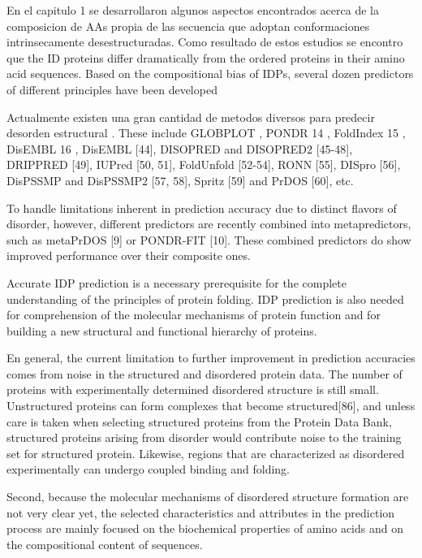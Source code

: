 En el capitulo 1 se desarrollaron algunos aspectos encontrados acerca de la composicion de AAs propia de las secuencia que adoptan conformaciones intrinsecamente desestructuradas.
Como resultado de estos estudios se encontro que the ID proteins differ dramatically from the ordered proteins in their amino acid sequences. 
Based on the compositional bias of IDPs, several dozen predictors of different principles have been developed

Actualmente existen una gran cantidad de metodos diversos para predecir desorden estructural \cite{he2009predicting}.
These include GLOBPLOT \cite{linding2003globplot}, PONDR 14 , FoldIndex 15 , DisEMBL 16 ,  DisEMBL [44], DISOPRED and DISOPRED2 [45-48],
DRIPPRED [49], IUPred [50, 51], FoldUnfold [52-54], RONN [55], DISpro [56], DisPSSMP and DisPSSMP2 [57, 58], Spritz [59] and PrDOS [60], etc.

To handle limitations inherent in prediction accuracy due to distinct flavors of disorder, however, different predictors are recently combined into metapredictors, such as metaPrDOS [9] or PONDR-FIT
[10]. These combined predictors do show improved performance over their composite ones.



Accurate IDP prediction is a necessary prerequisite for
the complete understanding of the principles of protein
folding. IDP prediction is also needed for comprehension
of the molecular mechanisms of protein function and
for building a new structural and functional hierarchy
of proteins.

En general, the current limitation to further improvement in prediction accuracies comes from noise in the structured and disordered protein data.
The number of proteins with experimentally determined disordered structure is still small.
Unstructured proteins can form complexes that become structured[86], and unless care is taken when selecting structured proteins from the Protein Data Bank, structured proteins arising from disorder would contribute noise to the training set for structured protein. 
Likewise, regions that are characterized as disordered experimentally can undergo coupled binding and folding.

Second, because the molecular mechanisms of disordered structure formation are not very clear yet, the selected characteristics and attributes in the prediction process are mainly focused on the biochemical properties of amino acids and on the compositional content of sequences.

